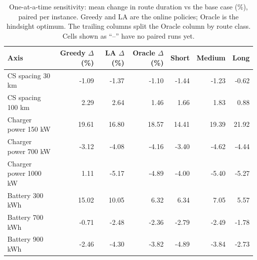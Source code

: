 \begin{table}[ht]\centering
\caption{One-at-a-time sensitivity: mean change in route duration vs the base case (\%), paired per instance.  Greedy and LA are the online policies; Oracle is the hindsight optimum.  The trailing columns split the Oracle column by route class.  Cells shown as ``--'' have no paired runs yet.}
\label{tab:sensitivity}
\begin{tabular}{lrrrrrr}
\hline
Axis & Greedy $\Delta$ (\%) & LA $\Delta$ (\%) & Oracle $\Delta$ (\%) & Short & Medium & Long \\
\hline
CS spacing 30 km & -1.09 & -1.37 & -1.10 & -1.44 & -1.23 & -0.62 \\
CS spacing 100 km & 2.29 & 2.64 & 1.46 & 1.66 & 1.83 & 0.88 \\
Charger power 150 kW & 19.61 & 16.80 & 18.57 & 14.41 & 19.39 & 21.92 \\
Charger power 700 kW & -3.12 & -4.08 & -4.16 & -3.40 & -4.62 & -4.44 \\
Charger power 1000 kW & 1.11 & -5.17 & -4.89 & -4.00 & -5.40 & -5.27 \\
Battery 300 kWh & 15.02 & 10.05 & 6.32 & 6.34 & 7.05 & 5.57 \\
Battery 700 kWh & -0.71 & -2.48 & -2.36 & -2.79 & -2.49 & -1.78 \\
Battery 900 kWh & -2.46 & -4.30 & -3.82 & -4.89 & -3.84 & -2.73 \\
\hline
\end{tabular}
\end{table}
